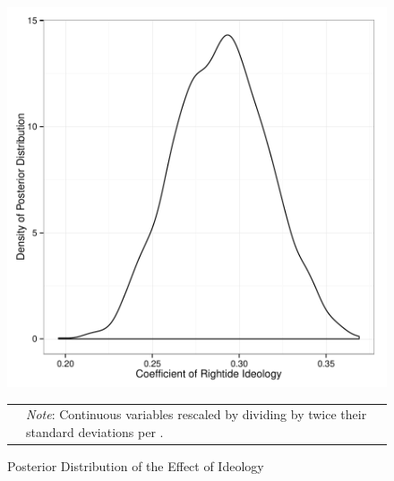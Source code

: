 \documentclass[12pt]{article}
\begin{document}
\begin{enumerate}
\begin{figure}[htbp] 
  \caption{Posterior Distribution of the Effect of Ideology}
  \label{F:postide}
  \begin{center}
    \includegraphics[width=5.25in]{PS3-f2.pdf}
  \end{center}
  \begin{footnotesize}
  \begin{tabular}{p{.4in} p{4.75in}}
  & \emph{Note}: Continuous variables rescaled by dividing by twice their standard deviations per \citet{Gelman2008}.
  \end{tabular}
  \end{footnotesize}
\end{figure}





\end{enumerate}
\end{document}
